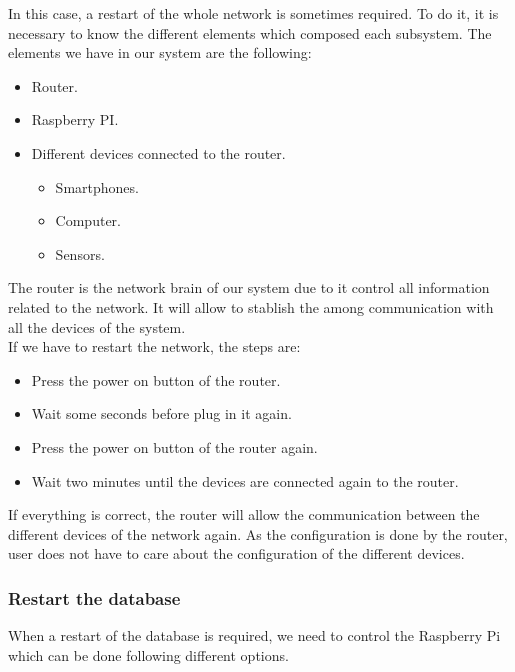 In this case, a restart of the whole network is sometimes required. To do it, it is necessary to know the different elements which composed each subsystem. The elements we have in our system are the following:

\begin{itemize}
\item Router.
\item Raspberry PI.
\item Different devices connected to the router.
\begin{itemize}
\item Smartphones.
\item Computer.
\item Sensors.
\end{itemize}	
\end{itemize}

The router is the network brain of our system due to it control all information related to the network. It will allow to stablish the among communication with all the devices of the system.\\

If we have to restart the network, the steps are:

\begin{itemize}
\item Press the power on button of the router.
\item Wait some seconds before plug in it again.
\item Press the power on button of the router again.
\item Wait two minutes until the devices are connected again to the router.
\end{itemize}

If everything is correct, the router will allow the communication between the different devices of the network again. As the configuration is done by the router, user does not have to care about the configuration of the different devices.\\

\subsubsection{Restart the database}

When a restart of the database is required, we need to control the Raspberry Pi which can be done following different options.

